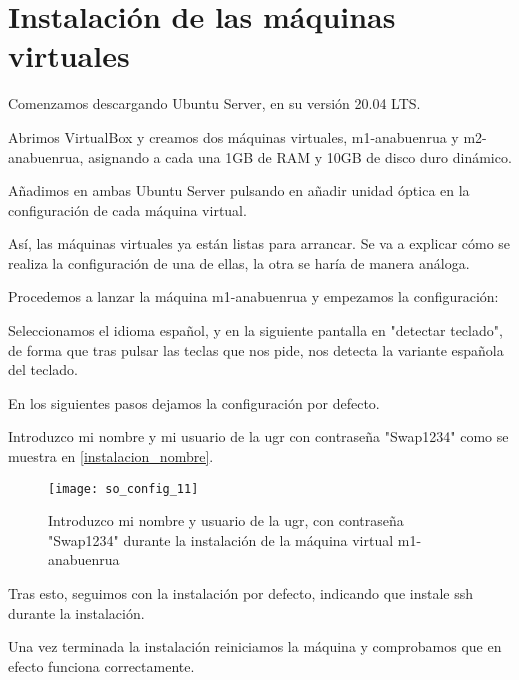 
\chapter{Instalación de las máquinas virtuales}

Comenzamos descargando Ubuntu Server, en su versión 20.04 LTS.

Abrimos VirtualBox y creamos dos máquinas virtuales, m1-anabuenrua y m2-anabuenrua, asignando a cada una 1GB de RAM y 10GB de disco duro dinámico.

Añadimos en ambas Ubuntu Server pulsando en añadir unidad óptica en la configuración de cada máquina virtual.

Así, las máquinas virtuales ya están listas para arrancar. Se va a explicar cómo se realiza la configuración de una de ellas, la otra se haría de manera análoga.

Procedemos a lanzar la máquina m1-anabuenrua y empezamos la configuración:

Seleccionamos el idioma español, y en la siguiente pantalla en "detectar teclado", de forma que tras pulsar las teclas que nos pide, nos detecta la variante española del teclado.

En los siguientes pasos dejamos la configuración por defecto.

Introduzco mi nombre y mi usuario de la ugr con contraseña "Swap1234" como se muestra en \eqref{instalacion_nombre}.

\begin{figure}
\begin{center}
\caption{Introduzco mi nombre y usuario de la ugr, con contraseña "Swap1234" durante la instalación de la máquina virtual m1-anabuenrua}
\label{instalacion_nombre}
\texttt{[image: so\_config\_11]}
\end{center}
\end{figure}

Tras esto, seguimos con la instalación por defecto, indicando que instale ssh durante la instalación.

Una vez terminada la instalación reiniciamos la máquina y comprobamos que en efecto funciona correctamente.

